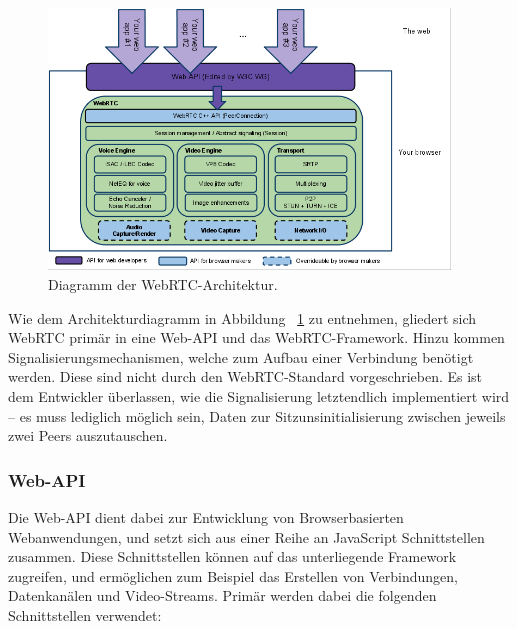 \begin{figure}[h]
\centering
\includegraphics[width=0.95\textwidth]{bilder/webrtc-diagram.png}
\caption{Diagramm der WebRTC-Architektur.}
\label{fig:webrtcArchitecture}
\end{figure}

Wie dem Architekturdiagramm in Abbildung ~\ref{fig:webrtcArchitecture} zu entnehmen, gliedert sich WebRTC primär in eine Web-\acs{API} und das \acs{WebRTC}-Framework. Hinzu kommen Signalisierungsmechanismen, welche zum Aufbau einer Verbindung benötigt werden. Diese sind nicht durch den WebRTC-Standard vorgeschrieben. Es ist dem Entwickler überlassen, wie die Signalisierung letztendlich implementiert wird -- es muss lediglich möglich sein, Daten zur Sitzunsinitialisierung zwischen jeweils zwei Peers auszutauschen.\par

\subsubsection*{Web-API}
Die Web-\acs{API} dient dabei zur Entwicklung von Browserbasierten Webanwendungen, und setzt sich aus einer Reihe an JavaScript Schnittstellen zusammen. Diese Schnittstellen können auf das unterliegende Framework zugreifen, und ermöglichen zum Beispiel das Erstellen von Verbindungen, Datenkanälen und Video-Streams. Primär werden dabei die folgenden Schnittstellen verwendet:

